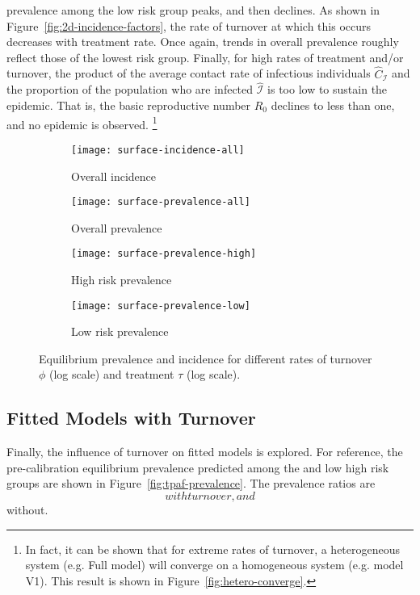 prevalence among the low risk group peaks, and then declines.
As shown in Figure~\ref{fig:2d-incidence-factors},
the rate of turnover at which this occurs decreases with treatment rate.
Once again, trends in overall prevalence
roughly reflect those of the lowest risk group.
Finally, for high rates of treatment and/or turnover, the product of
the average contact rate of infectious individuals $\hat{C}_\mathcal{I}$
and the proportion of the population who are infected $\hat{\mathcal{I}}$
is too low to sustain the epidemic.
That is, the basic reproductive number $R_0$ declines to less than one,
and no epidemic is observed.%
\footnote{In fact, it can be shown that for extreme rates of turnover,
  a heterogeneous system (e.g. Full model) will converge on
  a homogeneous system (e.g. model V1).
  This result is shown in Figure~\ref{fig:hetero-converge}.}
\begin{figure}
  \centering
  \begin{subfigure}{0.45\linewidth}
    \centering
    \texttt{[image: surface-incidence-all]}
    \caption{Overall incidence}
    \label{fig:surface-incidence-all}
  \end{subfigure}
  \begin{subfigure}{0.45\linewidth}
    \centering
    \texttt{[image: surface-prevalence-all]}
    \caption{Overall prevalence}
    \label{fig:surface-prevalence-all}
  \end{subfigure}
  \begin{subfigure}{0.45\linewidth}
    \centering
    \texttt{[image: surface-prevalence-high]}
    \caption{High risk prevalence}
    \label{fig:surface-prevalence-high}
  \end{subfigure}
  \begin{subfigure}{0.45\linewidth}
    \centering
    \texttt{[image: surface-prevalence-low]}
    \caption{Low risk prevalence}
    \label{fig:surface-prevalence-low}
  \end{subfigure}
  \caption{Equilibrium prevalence and incidence for different rates of
    turnover $\phi$ (log scale) and
    treatment $\tau$ (log scale).}
  \label{fig:surface}
\end{figure}
\subsection{Fitted Models with Turnover}\label{ss:res-turnover-fit}
Finally, the influence of turnover on fitted models is explored.
For reference, the pre-calibration equilibrium prevalence predicted
among the and low high risk groups are shown in Figure~\ref{fig:tpaf-prevalence}.
The prevalence ratios are
$$ with turnover, and 
$$ without.
